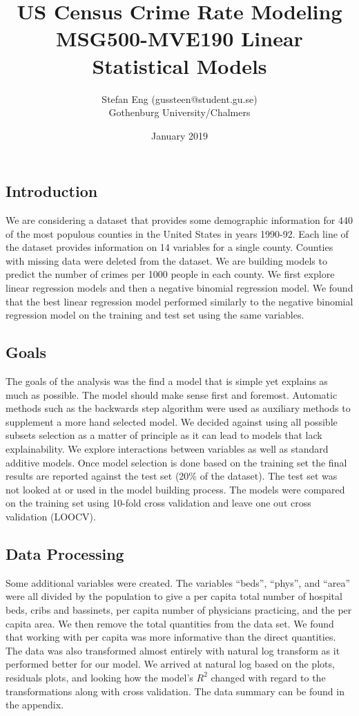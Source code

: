 \documentclass[]{article}
\title{US Census Crime Rate Modeling\\MSG500-MVE190 Linear Statistical Models}
\author{Stefan Eng (gussteen@student.gu.se)\\Gothenburg University/Chalmers}
\date{January 2019}
\begin{document}
\maketitle

\subsection{Introduction}\label{introduction}

We are considering a dataset that provides some demographic information
for 440 of the most populous counties in the United States in years
1990-92. Each line of the dataset provides information on 14 variables
for a single county. Counties with missing data were deleted from the
dataset. We are building models to predict the number of crimes per 1000
people in each county. We first explore linear regression models and
then a negative binomial regression model. We found that the best linear
regression model performed similarly to the negative binomial regression
model on the training and test set using the same variables.

\subsection{Goals}\label{goals}

The goals of the analysis was the find a model that is simple yet
explains as much as possible. The model should make sense first and
foremost. Automatic methods such as the backwards step algorithm were
used as auxiliary methods to supplement a more hand selected model. We
decided against using all possible subsets selection as a matter of
principle as it can lead to models that lack explainability. We explore
interactions between variables as well as standard additive models. Once
model selection is done based on the training set the final results are
reported against the test set (20\% of the dataset). The test set was
not looked at or used in the model building process. The models were
compared on the training set using 10-fold cross validation and leave
one out cross validation (LOOCV).

\subsection{Data Processing}\label{data-processing}

Some additional variables were created. The variables ``beds'',
``phys'', and ``area'' were all divided by the population to give a per
capita total number of hospital beds, cribs and bassinets, per capita
number of physicians practicing, and the per capita area. We then remove
the total quantities from the data set. We found that working with per
capita was more informative than the direct quantities. The data was
also transformed almost entirely with natural log transform as it
performed better for our model. We arrived at natural log based on the
plots, residuals plots, and looking how the model's \(R^2\) changed with
regard to the transformations along with cross validation. The data
summary can be found in the appendix.
\end{document}
